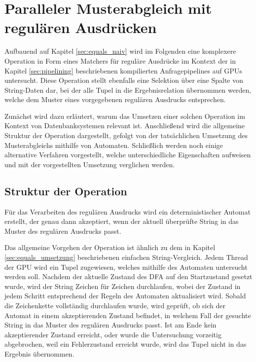 \chapter{Paralleler Musterabgleich mit regulären Ausdrücken}
\label{sec:regex_naiv}

Aufbauend auf Kapitel \ref{sec:equals_naiv} wird im Folgenden eine komplexere Operation in Form eines Matchers für reguläre Ausdrücke im Kontext der in Kapitel \ref{sec:pipelining} beschriebenen kompilierten Anfragepipelines auf GPUs untersucht.
Diese Operation stellt ebenfalls eine Selektion über eine Spalte von String-Daten dar, bei der alle Tupel in die Ergebnisrelation übernommen werden, welche dem Muster eines vorgegebenen regulären Ausdrucks entsprechen.

Zunächst wird dazu erläutert, warum das Umsetzen einer solchen Operation im Kontext von Datenbanksystemen relevant ist.
Anschließend wird die allgemeine Struktur der Operation dargestellt, gefolgt von der tatsächlichen Umsetzung des Musterabgleichs mithilfe von Automaten.
Schließlich werden noch einige alternative Verfahren vorgestellt, welche unterschiedliche Eigenschaften aufweisen und mit der vorgestellten Umsetzung verglichen werden.

\section{Struktur der Operation}

Für das Verarbeiten des regulären Ausdrucks wird ein deterministischer Automat erstellt, der genau dann akzeptiert, wenn der aktuell überprüfte String in das Muster des regulären Ausdrucks passt.

Das allgemeine Vorgehen der Operation ist ähnlich zu dem in Kapitel \ref{sec:equals_umsetzung} beschriebenen einfachen String-Vergleich.
Jedem Thread der GPU wird ein Tupel zugewiesen, welches mithilfe des Automaten untersucht werden soll.
Nachdem der aktuelle Zustand des DFA auf den Startzustand gesetzt wurde, wird der String Zeichen für Zeichen durchlaufen, wobei der Zustand in jedem Schritt entsprechend der Regeln des Automaten aktualisiert wird.
Sobald die Zeichenkette vollständig durchlaufen wurde, wird geprüft, ob sich der Automat in einem akzeptierenden Zustand befindet, in welchem Fall der gesuchte String in das Muster des regulären Ausdrucks passt.
Ist am Ende kein akzeptierender Zustand erreicht, oder wurde die Untersuchung vorzeitig abgebrochen, weil ein Fehlerzustand erreicht wurde, wird das Tupel nicht in das Ergebnis übernommen.

